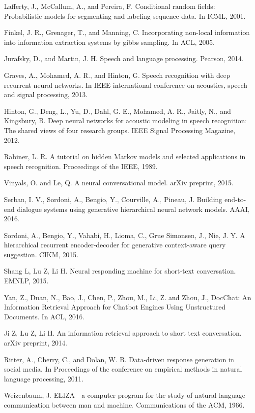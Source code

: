 \documentclass[paper=a4, fontsize=18pt]{article} %
\numberwithin{equation}{section} %
\numberwithin{figure}{section} %
\numberwithin{table}{section} %
\begin{document}
\begin{thebibliography}{10}
Lafferty, J., McCallum, A., and Pereira, F. Conditional random fields: Probabilistic models for segmenting and labeling sequence data. In ICML, 2001.

Finkel, J. R., Grenager, T., and Manning, C. Incorporating non-local information into information extraction systems by gibbs sampling. In ACL, 2005.

Jurafsky, D., and Martin, J. H. Speech and language processing. Pearson, 2014.

Graves, A., Mohamed, A. R., and Hinton, G. Speech recognition with deep recurrent neural networks. In IEEE international conference on acoustics, speech and signal processing, 2013.

Hinton, G., Deng, L., Yu, D., Dahl, G. E., Mohamed, A. R., Jaitly, N., and Kingsbury, B. Deep neural networks for acoustic modeling in speech recognition: The shared views of four research groups. IEEE Signal Processing Magazine, 2012.

Rabiner, L. R. A tutorial on hidden Markov models and selected applications in speech recognition. Proceedings of the IEEE, 1989.

Vinyals, O. and Le, Q. A neural conversational model. arXiv preprint, 2015.

Serban, I. V., Sordoni, A., Bengio, Y., Courville, A., Pineau, J. Building end-to-end dialogue systems using generative hierarchical neural network models. AAAI, 2016.

Sordoni, A., Bengio, Y., Vahabi, H., Lioma, C., Grue Simonsen, J., Nie, J. Y. A hierarchical recurrent encoder-decoder for generative context-aware query suggestion. CIKM, 2015.

Shang L, Lu Z, Li H. Neural responding machine for short-text conversation. EMNLP, 2015.

Yan, Z., Duan, N., Bao, J., Chen, P., Zhou, M., Li, Z. and Zhou, J., DocChat: An Information Retrieval Approach for Chatbot Engines Using Unstructured Documents. In ACL, 2016.

Ji Z, Lu Z, Li H. An information retrieval approach to short text conversation. arXiv preprint, 2014.

Ritter, A., Cherry, C., and Dolan, W. B. Data-driven response generation in social media. In Proceedings of the conference on empirical methods in natural language processing, 2011.

Weizenbaum, J. ELIZA - a computer program for the study of natural language communication between man and machine. Communications of the ACM, 1966.

\end{thebibliography}


\end{document}
